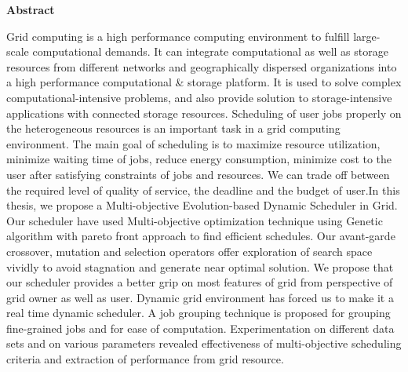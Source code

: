 \begin{center}
	\huge{\textbf{Abstract}}
\end{center}
Grid computing is a high performance computing environment to fulfill large-scale computational demands. It can integrate computational as well as storage resources from different networks and geographically dispersed organizations into a high performance computational \& storage platform. It is used to solve complex computational-intensive problems, and also provide solution to storage-intensive applications with connected storage resources. Scheduling of user jobs properly on the heterogeneous resources is an important task in a grid computing environment. The main goal of scheduling is to maximize resource utilization, minimize waiting time of jobs, reduce energy consumption, minimize cost to the user after satisfying constraints of jobs and resources. We can trade off between the required level of quality of service, the deadline and the budget of user.In this thesis, we propose a Multi-objective Evolution-based Dynamic Scheduler in Grid. 
Our scheduler have used Multi-objective optimization technique using Genetic algorithm with pareto front approach to find efficient schedules. Our avant-garde crossover, mutation and selection operators offer exploration of search space vividly to avoid stagnation and generate near optimal solution. We propose that our scheduler provides a better grip on most features of grid from perspective of grid owner as well as user. Dynamic grid environment has forced us to make it a real time dynamic scheduler. A job grouping technique is proposed for grouping fine-grained jobs and for ease of computation. Experimentation on different data sets and on various parameters revealed effectiveness of multi-objective scheduling criteria and extraction of performance from grid resource. 
